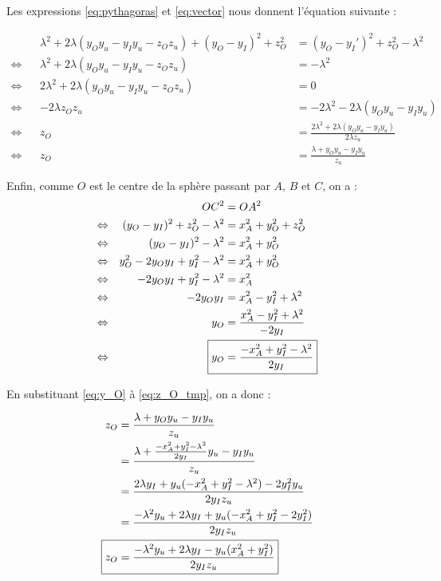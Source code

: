 \documentclass{article}
\begin{document}
\begin{enumerate}
    Les expressions \ref{eq:pythagoras} et \ref{eq:vector} nous donnent l'équation suivante :
    
    \begin{align}
        && \lambda^2 + 2\lambda(y_Oy_u - y_Iy_u - z_Oz_u) + (y_O - y_I)^2 + z_O^2 &= (y_O - y_I')^2 + z_O^2 - \lambda^2\nonumber\\
        \Leftrightarrow && \lambda^2 + 2\lambda(y_Oy_u - y_Iy_u - z_Oz_u) &= - \lambda^2 \nonumber\\
        \Leftrightarrow && 2\lambda^2 + 2\lambda(y_Oy_u - y_Iy_u - z_Oz_u) &= 0 \nonumber\\
        \Leftrightarrow &&  -2\lambda z_Oz_u &= -2\lambda^2 - 2\lambda(y_Oy_u - y_Iy_u)\nonumber\\
        \Leftrightarrow &&  z_O &= \frac{2\lambda^2 + 2\lambda(y_Oy_u - y_Iy_u)}{2\lambda z_u}\nonumber\\
        \Leftrightarrow &&  z_O &= \frac{\lambda + y_Oy_u - y_Iy_u}{z_u}\label{eq:z_O_tmp}
    \end{align}

    Enfin, comme $O$ est le centre de la sphère passant par $A$, $B$ et $C$, on a :
    \begin{align}
        && OC^2 &= OA^2\nonumber\\
        \Leftrightarrow && (y_O - y_I)^2 + z_O^2 - \lambda^2 &= x_A^2 + y_O^2 + z_O^2\nonumber\\
        \Leftrightarrow && (y_O - y_I)^2 - \lambda^2 &= x_A^2 + y_O^2\nonumber\\
        \Leftrightarrow && y_O^2 - 2y_O y_I + y_I^2 - \lambda^2 &= x_A^2 + y_O^2\nonumber\\
        \Leftrightarrow && -2y_O y_I + y_I^2 - \lambda^2 &= x_A^2\nonumber\\
        \Leftrightarrow && -2y_O y_I &= x_A^2 - y_I^2 + \lambda^2 \nonumber\\
        \Leftrightarrow && y_O &= \frac{x_A^2 - y_I^2 + \lambda^2}{-2y_I}\nonumber\\
        \Leftrightarrow && \Aboxed{y_O &= \frac{-x_A^2 + y_I^2 - \lambda^2}{2y_I}}\label{eq:y_O}
    \end{align}
    
    En substituant \ref{eq:y_O} à \ref{eq:z_O_tmp}, on a donc :
    
    \begin{align}
        z_O &= \frac{\lambda + y_Oy_u - y_Iy_u}{z_u} \nonumber\\
            &= \frac{\lambda + \frac{-x_A^2 + y_I^2 - \lambda^2}{2y_I}y_u - y_Iy_u}{z_u} \nonumber\\
            &= \frac{2\lambda y_I + y_u(-x_A^2 + y_I^2 - \lambda^2) - 2y_I^2y_u}{2y_Iz_u}  \nonumber\\
            &= \frac{-\lambda^2y_u + 2\lambda y_I + y_u(-x_A^2 + y_I^2 - 2y_I^2)}{2y_Iz_u}  \nonumber\\
            \Aboxed{ z_O &= \frac{-\lambda^2y_u + 2\lambda y_I  - y_u(x_A^2 + y_I^2)}{2y_Iz_u}}  \label{eq:z_O}
    \end{align}
    


\end{enumerate}
\end{document}
